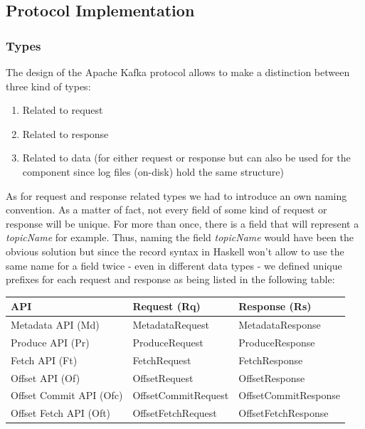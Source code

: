 \subsection{Protocol Implementation}

\subsubsection{Types}

The design of the Apache Kafka protocol allows to make a distinction between three kind of types:
\begin{enumerate}
  \item Related to request
  \item Related to response
  \item Related to data (for either request or response but can also be used for the  component since log files (on-disk) hold the same structure)
\end{enumerate}

As for request and response related types we had to introduce an own naming
convention. As a matter of fact, not every field of some kind of request or
response will be unique. For more than once, there is a field that will
represent a \textit{topicName} for example. Thus, naming the field \textit{
topicName} would have been the obvious solution but since the record syntax in
Haskell won't allow to use the same name for a field twice - even in different
data types - we defined unique prefixes for each request and response as being
listed in the following table:

\begin{table}[h]
\centering
\begin{tabular}{|l|l|l|}
\hline
\textbf{API}            & \textbf{Request (Rq)} & \textbf{Response (Rs)} \\ \hline
Metadata API (Md)       & MetadataRequest       & MetadataResponse       \\ \hline
Produce API (Pr)        & ProduceRequest        & ProduceResponse        \\ \hline
Fetch API (Ft)          & FetchRequest          & FetchResponse          \\ \hline
Offset API (Of)         & OffsetRequest         & OffsetResponse         \\ \hline
Offset Commit API (Ofc) & OffsetCommitRequest   & OffsetCommitResponse   \\ \hline
Offset Fetch API (Oft)  & OffsetFetchRequest    & OffsetFetchResponse    \\ \hline
\end{tabular}
\end{table}

